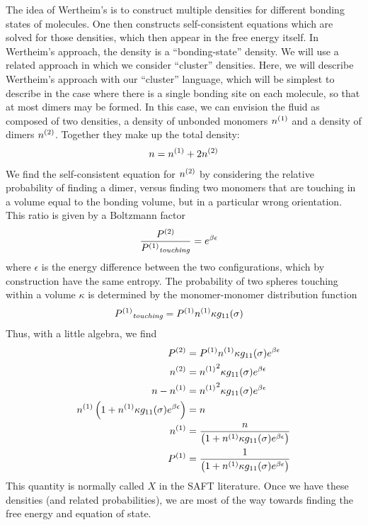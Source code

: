 \documentclass[letterpaper,twocolumn,amsmath,amssymb,pre]{revtex4-1}
\begin{document}
The idea of Wertheim's is to construct multiple densities for
different bonding states of molecules.  One then constructs
self-consistent equations which are solved for those densities, which
then appear in the free energy itself.  In Wertheim's approach, the
density is a ``bonding-state'' density.  We will use a related
approach in which we consider ``cluster'' densities.  Here, we will
describe Wertheim's approach with our ``cluster'' language, which will
be simplest to describe in the case where there is a single
bonding site on each molecule, so that at most dimers may be formed.
In this case, we can envision the fluid as composed of two densities,
a density of unbonded monomers ${n^{(1)}}$ and a density of dimers ${n^{(2)}}$.
Together they make up the total density:
\begin{align}
  n = {n^{(1)}} + 2{n^{(2)}}
\end{align}
We find the self-consistent equation for ${n^{(2)}}$ by considering the
relative probability of finding a dimer, versus finding two monomers
that are touching in a volume equal to the bonding volume, but in a
particular wrong orientation.  This ratio is given by a Boltzmann
factor
\begin{align}
  \frac{{P^{(2)}}}{{P^{(1)}}_{\textit{touching}}} &= e^{\beta\epsilon}
\end{align}
where $\epsilon$ is the energy difference between the two
configurations, which by construction have the same entropy.  The
probability of two spheres touching within a volume $\kappa$ is
determined by the monomer-monomer distribution function
\begin{align}
  {P^{(1)}}_{\textit{touching}} &= {P^{(1)}} {n^{(1)}}\kappa g_{11}(\sigma)
\end{align}
Thus, with a little algebra, we find
\begin{align}
  {P^{(2)}} &= {P^{(1)}} {n^{(1)}}\kappa g_{11}(\sigma) e^{\beta\epsilon} \\
  {n^{(2)}} &= {n^{(1)}}^2\kappa g_{11}(\sigma) e^{\beta\epsilon} \\
  n - {n^{(1)}} &= {n^{(1)}}^2\kappa g_{11}(\sigma) e^{\beta\epsilon} \\
  {n^{(1)}}\left(1 + {n^{(1)}}\kappa g_{11}(\sigma) e^{\beta\epsilon}\right) &= n \\
  {n^{(1)}} &= \frac{n}{\left(1 + {n^{(1)}}\kappa g_{11}(\sigma) e^{\beta\epsilon}\right)} \\
  {P^{(1)}} &= \frac{1}{\left(1 + {n^{(1)}}\kappa g_{11}(\sigma) e^{\beta\epsilon}\right)}
\end{align}
This quantity is normally called $X$ in the SAFT literature.  Once we
have these densities (and related probabilities), we are most of the
way towards finding the free energy and equation of state.
\end{document}
